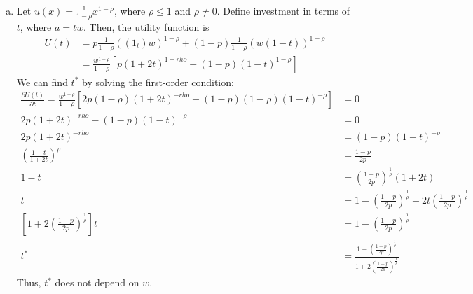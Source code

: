 \documentclass{article}
\begin{document}
\begin{enumerate}[(a)]
	\item Let $u(x)=\frac{1}{1-\rho}x^{1-\rho}$, where $\rho\leq 1$ and $\rho\neq 0$. Define investment in terms of $t$, where $a=tw$. Then, the utility function is
		\begin{align*}
			U(t) 	&= p\frac{1}{1-\rho}((1_t)w)^{1-\rho} + (1-p)\frac{1}{1-\rho}(w(1-t))^{1-\rho}	\\
					&= \frac{w^{1-\rho}}{1-\rho}\left[ p(1+2t)^{1-rho} + (1-p)(1-t)^{1-\rho} \right]
		\end{align*}
		We can find $t^*$ by solving the first-order condition:
		\begin{align*}
			\frac{\partial U(t)}{\partial t} = \frac{w^{1-\rho}}{1-\rho}\left[ 2p(1-\rho)(1+2t)^{-rho} - (1-p)(1-\rho)(1-t)^{-\rho} \right] &= 0 \\
					2p(1+2t)^{-rho} - (1-p)(1-t)^{-\rho} &= 0	\\
					2p(1+2t)^{-rho}  &= (1-p)(1-t)^{-\rho}		\\
					\left(\frac{1-t}{1+2t}\right)^\rho &= \frac{1-p}{2p}	\\
					1-t &= \left(\frac{1-p}{2p}\right)^\frac{1}{\rho}(1+2t)	\\
					t &= 1-\left(\frac{1-p}{2p}\right)^\frac{1}{\rho}- 2t\left(\frac{1-p}{2p}\right)^\frac{1}{\rho} \\
					\left[1+2\left(\frac{1-p}{2p}\right)^\frac{1}{\rho}\right]t &= 1-\left(\frac{1-p}{2p}\right)^\frac{1}{\rho}	\\
					t^* &= \frac{1-\left(\frac{1-p}{2p}\right)^\frac{1}{\rho}}{1+2\left(\frac{1-p}{2p}\right)^\frac{1}{\rho}}
		\end{align*}
		Thus, $t^*$ does not depend on $w$.
		

\end{enumerate}
\end{document}
